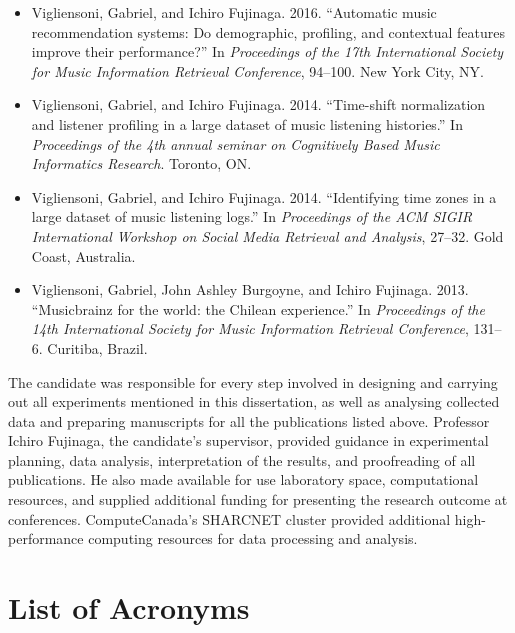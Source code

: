 \documentclass[12pt,letterpaper]{report}
\begin{document}
\begin{itemize}
  \item Vigliensoni, Gabriel, and Ichiro Fujinaga. 2016. “Automatic music recommendation systems: Do demographic, profiling, and contextual features improve their performance?” In \textit{Proceedings of the 17th International Society for Music Information Retrieval Conference}, 94--100. New York City, NY.
  \item Vigliensoni, Gabriel, and Ichiro Fujinaga. 2014. “Time-shift normalization and listener profiling in a large dataset of music listening histories.” In \textit{Proceedings of the 4th annual seminar on Cognitively Based Music Informatics Research}. Toronto, ON.
  \item Vigliensoni, Gabriel, and Ichiro Fujinaga. 2014. “Identifying time zones in a large dataset of music listening logs.” In \textit{Proceedings of the ACM SIGIR International Workshop on Social Media Retrieval and Analysis}, 27--32. Gold Coast, Australia.
  \item Vigliensoni, Gabriel, John Ashley Burgoyne, and Ichiro Fujinaga. 2013. “Musicbrainz for the world: the Chilean experience.” In \textit{Proceedings of the 14th International Society for Music Information Retrieval Conference}, 131--6. Curitiba, Brazil.
\end{itemize}

The candidate was responsible for every step involved in designing and carrying out all experiments mentioned in this dissertation, as well as analysing collected data and preparing manuscripts for all the publications listed above. 
Professor Ichiro Fujinaga, the candidate's supervisor, provided guidance in experimental planning, data analysis, interpretation of the results, and proofreading of all publications. He also made available for use laboratory space, computational resources, and supplied additional funding for presenting the research outcome at conferences.
ComputeCanada's SHARCNET cluster provided additional high-performance computing resources for data processing and analysis.

\setcounter{tocdepth}{2} %
\tableofcontents
\listoffigures
\listoftables


\chapter*{List of Acronyms}
\end{document}
